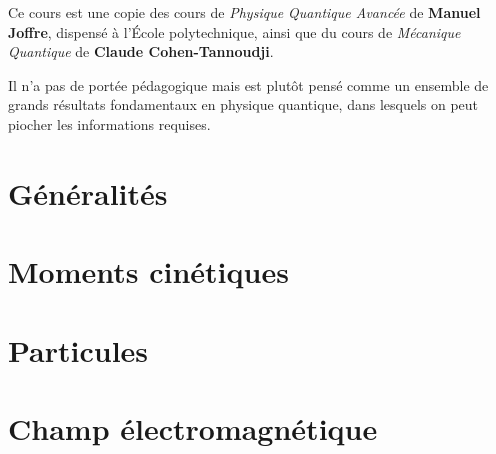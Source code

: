 \documentclass[a4paper, 12pt]{article}
\begin{document}


\tableofcontents

\clearpage
Ce cours est une copie des cours de \textit{Physique Quantique Avancée} de \textbf{Manuel Joffre}, dispensé à l’École polytechnique, ainsi que du cours de \textit{Mécanique Quantique} de \textbf{Claude Cohen-Tannoudji}.


Il n’a pas de portée pédagogique mais est plutôt pensé comme un ensemble de grands résultats fondamentaux en physique quantique, dans lesquels on peut piocher les informations requises.

\clearpage
\part{Généralités}







\clearpage
\part{Moments cinétiques}







\clearpage
\part{Particules}





\clearpage 
\part{Champ électromagnétique}


\end{document}
